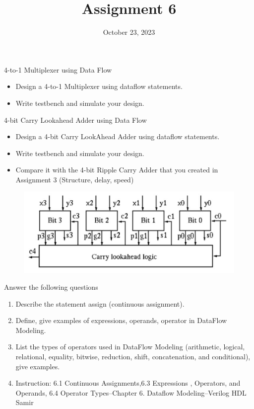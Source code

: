 \documentclass{vhdl-assignment}
\title{Assignment 6}
\date{October 23, 2023}
\begin{document}
\maketitle
\thispagestyle{fancy}

\begin{problem}{4-to-1 Multiplexer using Data Flow}
    \begin{itemize}
        \item Design a 4-to-1 Multiplexer using dataflow statements.
        \item Write testbench and simulate your design.
    \end{itemize}
\end{problem}

\begin{problem}{4-bit Carry Lookahead Adder using Data Flow}
    \begin{itemize}
        \item Design a 4-bit Carry LookAhead Adder using dataflow statements.
        \item Write testbench and simulate your design.
        \item Compare it with the 4-bit Ripple Carry Adder that you created in Assignment 3 (Structure, delay, speed)
    \end{itemize}
    \begin{figure}[H]
        \centering
        \includegraphics{assets/CarryLookAheadAdder.jpg}
    \end{figure} 
\end{problem}

\begin{problem}{Answer the following questions}
    \begin{enumerate}
        \item Describe the statement assign (continuous assignment).
        \item Define, give examples of expressions, operands, operator in DataFlow Modeling.
        \item List the types of operators used in DataFlow Modeling (arithmetic, logical, relational, equality, bitwise, reduction, shift, concatenation, and conditional), give examples.
        \item Instruction: 6.1 Continuous Assignments,6.3 Expressions , Operators, and Operands, 6.4 Operator Types–Chapter 6. Dataflow Modeling–Verilog HDL Samir
    \end{enumerate}
\end{problem}
\end{document}
